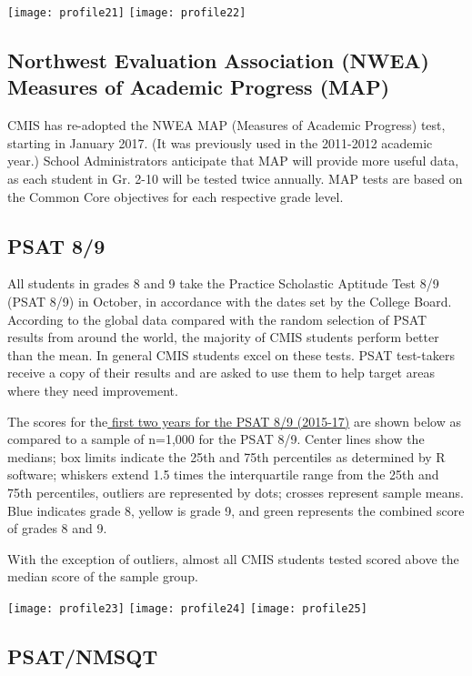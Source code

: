 \texttt{[image: profile21]}
\texttt{[image: profile22]}

\subsection{Northwest Evaluation Association (NWEA) Measures of Academic Progress (MAP)}

CMIS has re-adopted the NWEA MAP (Measures of Academic Progress) test, starting in January 2017. (It was previously used in the 2011-2012 academic year.)  School Administrators anticipate that MAP will provide more useful data, as each student in Gr. 2-10 will be tested twice annually.  MAP tests are based on the Common Core objectives for each respective grade level.  

\subsection{PSAT 8/9}

All students in grades 8 and 9 take the Practice Scholastic Aptitude Test 8/9 (PSAT 8/9) in October, in accordance with the dates set by the College Board. According to the global data compared with the random selection of PSAT results from around the world, the majority of CMIS students perform better than the mean. In general CMIS students excel on these tests.   PSAT test-takers receive a copy of their results and are asked to use them to help target areas where they need improvement.  

The scores for the\href{https://docs.google.com/a/cmis.ac.th/spreadsheets/d/1OVMnw4x1eUg-QByMt2J2IZJkovZGys_8uoj1SKSM2As/edit?usp=sharing}{ first two years for the PSAT 8/9 (2015-17)} are shown below as compared to a sample of n=1,000 for the PSAT 8/9.  Center lines show the medians; box limits indicate the 25th and 75th percentiles as determined by R software; whiskers extend 1.5 times the interquartile range from the 25th and 75th percentiles, outliers are represented by dots; crosses represent sample means. Blue indicates grade 8, yellow is grade 9, and green represents the combined score of grades 8 and 9.  

With the exception of outliers, almost all CMIS students tested scored above the median score of the sample group.  

\texttt{[image: profile23]}
\texttt{[image: profile24]}
\texttt{[image: profile25]}

\subsection{PSAT/NMSQT}

